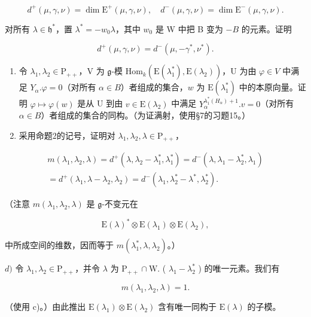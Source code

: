 \[
d ^ {+} (\mu , \gamma , \nu) = \dim \mathrm{E} ^ {+} (\mu , \gamma , \nu), \quad d ^ {-} (\mu , \gamma , \nu) = \dim \mathrm{E} ^ {-} (\mu , \gamma , \nu).
\]

对所有 \(\lambda \in \mathfrak{h}^*\)，置 \(\lambda^{*} = -w_{0}\lambda\)，其中 \(w_{0}\) 是 W 中把 B 变为 \(-B\) 的元素。证明

\[
d ^ {+} (\mu , \gamma , \nu) = d ^ {-} (\mu , - \gamma^ {*}, \nu^ {*}).
\]

\begin{enumerate}
\def\labelenumi{\alph{enumi})}
\setcounter{enumi}{1}
\item
  令 \(\lambda_1, \lambda_2 \in \mathrm{P}_{++}\)，V 为 \(\mathfrak{g}\)-模 \(\mathrm{Hom}_k(\mathrm{E}(\lambda_1^*), \mathrm{E}(\lambda_2))\)，U 为由 \(\varphi \in V\) 中满足 \(Y_\alpha. \varphi = 0\)（对所有 \(\alpha \in B\)）者组成的集合，\(w\) 为 \(\mathrm{E}(\lambda_1^*)\) 中的本原向量。证明 \(\varphi \mapsto \varphi(w)\) 是从 U 到由 \(v \in \mathrm{E}(\lambda_2)\) 中满足 \(Y_\alpha^{\lambda_1^*(H_\alpha)+1}. v = 0\)（对所有 \(\alpha \in B\)）者组成的集合的同构。（为证满射，使用§7的习题15。）
\item
  采用命题2的记号，证明对 \(\lambda_1, \lambda_2, \lambda \in \mathrm{P}_{++}\)，
\end{enumerate}

\[
\begin{array}{r} m (\lambda_ {1}, \lambda_ {2}, \lambda) = d ^ {+} (\lambda , \lambda_ {2} - \lambda_ {1} ^ {*}, \lambda_ {1} ^ {*}) = d ^ {-} (\lambda , \lambda_ {1} - \lambda_ {2} ^ {*}, \lambda_ {1}) \\ = d ^ {+} (\lambda_ {1}, \lambda - \lambda_ {2}, \lambda_ {2}) = d ^ {-} (\lambda_ {1}, \lambda_ {2} ^ {*} - \lambda^ {*}, \lambda_ {2} ^ {*}). \end{array}
\]

（注意 \(m(\lambda_1,\lambda_2,\lambda)\) 是 \(\mathfrak{g}\)-不变元在

\[
\mathrm{E} (\lambda) ^ {*} \otimes \mathrm{E} (\lambda_ {1}) \otimes \mathrm{E} (\lambda_ {2}),
\]

中所成空间的维数，因而等于 \(m(\lambda_1^*, \lambda, \lambda_2)\)。）

\(d)\) 令 \(\lambda_1, \lambda_2 \in \mathrm{P}_{++}\)，并令 \(\lambda\) 为 \(\mathrm{P}_{++} \cap \mathrm{W}.\) ( \(\lambda_1 - \lambda_2^*\) ) 的唯一元素。我们有

\[
m (\lambda_ {1}, \lambda_ {2}, \lambda) = 1.
\]

（使用 c)。）由此推出 \(\mathrm{E}(\lambda_1) \otimes \mathrm{E}(\lambda_2)\) 含有唯一同构于 \(\mathrm{E}(\lambda)\) 的子模。


